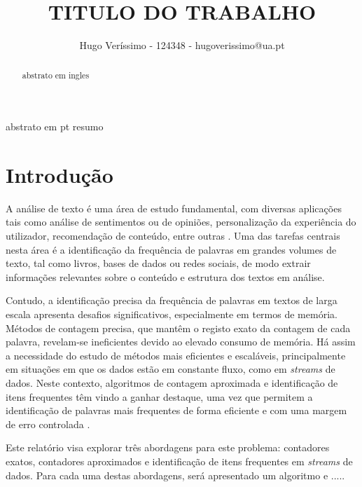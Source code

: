 \documentclass[mirror, portugues]{revdetua}
\begin{document}

\title{TITULO DO TRABALHO}
\author{Hugo Veríssimo - 124348 - hugoverissimo@ua.pt}
\maketitle

\begin{abstract}
abstrato em ingles
\end{abstract}

\begin{resumo}
abstrato em pt resumo
\end{resumo}


\section{Introdução}

A análise de texto é uma área de estudo fundamental, com diversas aplicações tais como análise de sentimentos ou de opiniões, personalização da experiência do utilizador, recomendação de conteúdo, entre outras \cite{AZ24}. Uma das tarefas centrais nesta área é a identificação da frequência de palavras em grandes volumes de texto, tal como livros, bases de dados ou redes sociais, de modo extrair informações relevantes sobre o conteúdo e estrutura dos textos em análise.

Contudo, a identificação precisa da frequência de palavras em textos de larga escala apresenta desafios significativos, especialmente em termos de memória. Métodos de contagem precisa, que mantêm o registo exato da contagem de cada palavra, revelam-se ineficientes devido ao elevado consumo de memória. Há assim a necessidade do estudo de métodos mais eficientes e escaláveis, principalmente em situações em que os dados estão em constante fluxo, como em \textit{streams} de dados. Neste contexto, algoritmos de contagem aproximada e identificação de itens frequentes têm vindo a ganhar destaque, uma vez que permitem a identificação de palavras mais frequentes de forma eficiente e com uma margem de erro controlada \cite{LH06}.

Este relatório visa explorar três abordagens para este problema: contadores exatos, contadores aproximados e identificação de itens frequentes em \textit{streams} de dados. Para cada uma destas abordagens, será apresentado um algoritmo e .....


\end{document}
